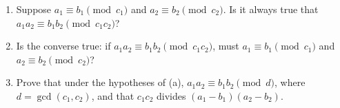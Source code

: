 \begin{enumerate}
\item[(a)] Suppose $a_1\equiv b_1\pmod{c_1}$ and $a_2\equiv b_2\pmod{c_2}$. Is it always true that $a_1a_2\equiv b_1b_2\pmod{c_1c_2}$?
\item[(b)] Is the converse true: if $a_1a_2\equiv b_1b_2\pmod{c_1c_2}$, must $a_1\equiv b_1\pmod{c_1}$ and $a_2\equiv b_2\pmod{c_2}$?
\item[(c)] Prove that under the hypotheses of (a), $a_1a_2\equiv b_1b_2\pmod{d}$, where $d=\gcd(c_1,c_2)$, and that $c_1c_2$ divides $(a_1-b_1)(a_2-b_2)$.
\end{enumerate}

